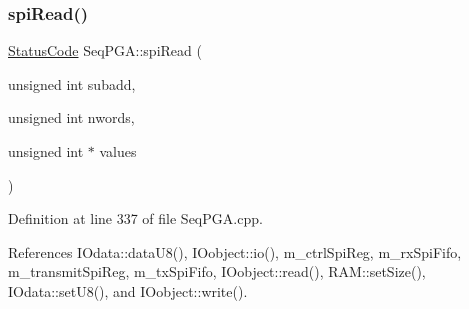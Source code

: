 \subsubsection{\texorpdfstring{spi\+Read()}{spiRead()}\hspace{0.1cm}{\footnotesize\ttfamily [1/3]}}
{\footnotesize\ttfamily \hyperlink{classStatusCode}{Status\+Code} Seq\+P\+G\+A\+::spi\+Read (\begin{DoxyParamCaption}\item[{unsigned int}]{subadd,  }\item[{unsigned int}]{nwords,  }\item[{unsigned int $\ast$}]{values }\end{DoxyParamCaption})}



Definition at line 337 of file Seq\+P\+G\+A.\+cpp.



References I\+Odata\+::data\+U8(), I\+Oobject\+::io(), m\+\_\+ctrl\+Spi\+Reg, m\+\_\+rx\+Spi\+Fifo, m\+\_\+transmit\+Spi\+Reg, m\+\_\+tx\+Spi\+Fifo, I\+Oobject\+::read(), R\+A\+M\+::set\+Size(), I\+Odata\+::set\+U8(), and I\+Oobject\+::write().



